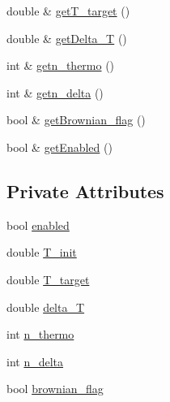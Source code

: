 \begin{DoxyCompactItemize}
\item 
double \& \hyperlink{classThermostat_a83b2ed651c6ef97fdb306791c056e790}{get\-T\-\_\-target} ()
\item 
double \& \hyperlink{classThermostat_a4dfa1bf0c8250109f621ca67dc4b9d21}{get\-Delta\-\_\-\-T} ()
\item 
int \& \hyperlink{classThermostat_ac88fdcd49a14f5c28fd2433274c1ee94}{getn\-\_\-thermo} ()
\item 
int \& \hyperlink{classThermostat_a4874b207620e187886359077e5928df8}{getn\-\_\-delta} ()
\item 
bool \& \hyperlink{classThermostat_a959655befa411badcfff9919c0fc9417}{get\-Brownian\-\_\-flag} ()
\item 
bool \& \hyperlink{classThermostat_a5a270ca35680c0f15cee0438e7e2c096}{get\-Enabled} ()
\end{DoxyCompactItemize}
\subsection*{Private Attributes}
\begin{DoxyCompactItemize}
\item 
bool \hyperlink{classThermostat_ae383f11c6ba111f1f14b470a17655d04}{enabled}
\item 
double \hyperlink{classThermostat_a663a14e3a4b7bf439c92fbcd0ebac7a3}{T\-\_\-init}
\item 
double \hyperlink{classThermostat_a63c42ca7dee6ed5237d8be9e9c3f1228}{T\-\_\-target}
\item 
double \hyperlink{classThermostat_a1628e1ae6669caacbb02da75423cc35c}{delta\-\_\-\-T}
\item 
int \hyperlink{classThermostat_a25a5e29fbae46ffb4152655b3ba062cf}{n\-\_\-thermo}
\item 
int \hyperlink{classThermostat_a9a2715e81ed11171e530e2d22a682244}{n\-\_\-delta}
\item 
bool \hyperlink{classThermostat_a86ae25ddde5ab2ecd7d70a50c8a72823}{brownian\-\_\-flag}
\end{DoxyCompactItemize}



